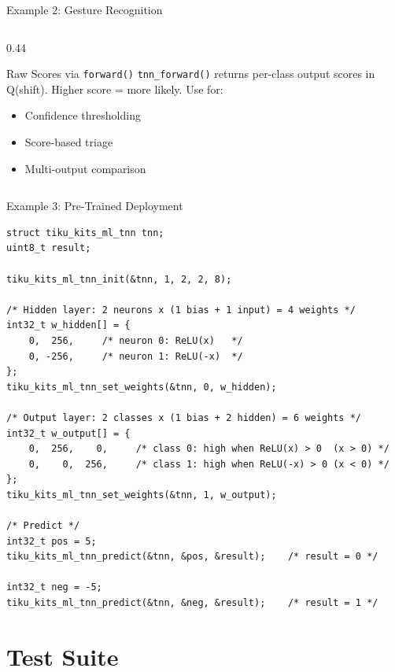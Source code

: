 \documentclass[aspectratio=169, 10pt]{beamer}
\begin{document}
\begin{frame}[fragile]{Example 2: Gesture Recognition}
\begin{columns}[T]
\begin{column}{0.44\textwidth}
\begin{center}
\end{center}

\vspace{0.5em}
\begin{block}{Raw Scores via \texttt{forward()}}
\texttt{tnn\_forward()} returns per-class output
scores in Q(shift). Higher score = more likely.
Use for:
\begin{itemize}
  \item Confidence thresholding
  \item Score-based triage
  \item Multi-output comparison
\end{itemize}
\end{block}
\end{column}
\end{columns}
\end{frame}

\begin{frame}[fragile]{Example 3: Pre-Trained Deployment}
\begin{lstlisting}[style=cstyle,
  title={Load weights trained offline}]
struct tiku_kits_ml_tnn tnn;
uint8_t result;

tiku_kits_ml_tnn_init(&tnn, 1, 2, 2, 8);

/* Hidden layer: 2 neurons x (1 bias + 1 input) = 4 weights */
int32_t w_hidden[] = {
    0,  256,     /* neuron 0: ReLU(x)   */
    0, -256,     /* neuron 1: ReLU(-x)  */
};
tiku_kits_ml_tnn_set_weights(&tnn, 0, w_hidden);

/* Output layer: 2 classes x (1 bias + 2 hidden) = 6 weights */
int32_t w_output[] = {
    0,  256,    0,     /* class 0: high when ReLU(x) > 0  (x > 0) */
    0,    0,  256,     /* class 1: high when ReLU(-x) > 0 (x < 0) */
};
tiku_kits_ml_tnn_set_weights(&tnn, 1, w_output);

/* Predict */
int32_t pos = 5;
tiku_kits_ml_tnn_predict(&tnn, &pos, &result);    /* result = 0 */

int32_t neg = -5;
tiku_kits_ml_tnn_predict(&tnn, &neg, &result);    /* result = 1 */
\end{lstlisting}
\end{frame}

\section{Test Suite}
\end{document}
